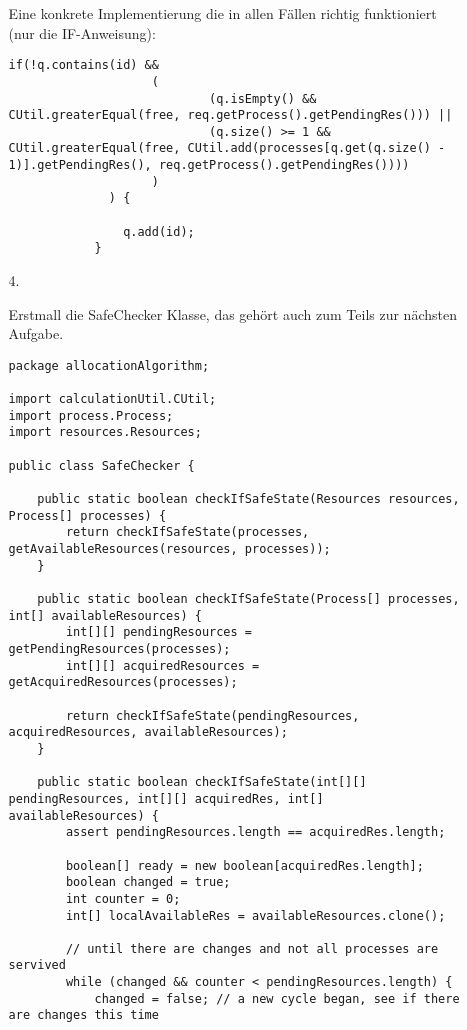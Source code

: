 \begin{enumerate}
\begin{enumerate}
Eine konkrete Implementierung die in allen Fällen richtig funktioniert (nur die IF-Anweisung):

\begin{lstlisting}[style=java]
if(!q.contains(id) &&
                    (
                            (q.isEmpty() && CUtil.greaterEqual(free, req.getProcess().getPendingRes())) ||
                            (q.size() >= 1 && CUtil.greaterEqual(free, CUtil.add(processes[q.get(q.size() - 1)].getPendingRes(), req.getProcess().getPendingRes())))
                    )
              ) {

                q.add(id);
            }
\end{lstlisting}

\item[4.]

Erstmall die SafeChecker Klasse, das gehört auch zum Teils zur nächsten Aufgabe. 

\begin{lstlisting}[style=java]
package allocationAlgorithm;

import calculationUtil.CUtil;
import process.Process;
import resources.Resources;

public class SafeChecker {

    public static boolean checkIfSafeState(Resources resources, Process[] processes) {
        return checkIfSafeState(processes, getAvailableResources(resources, processes));
    }

    public static boolean checkIfSafeState(Process[] processes, int[] availableResources) {
        int[][] pendingResources = getPendingResources(processes);
        int[][] acquiredResources = getAcquiredResources(processes);

        return checkIfSafeState(pendingResources, acquiredResources, availableResources);
    }

    public static boolean checkIfSafeState(int[][] pendingResources, int[][] acquiredRes, int[] availableResources) {
        assert pendingResources.length == acquiredRes.length;

        boolean[] ready = new boolean[acquiredRes.length];
        boolean changed = true;
        int counter = 0;
        int[] localAvailableRes = availableResources.clone();

        // until there are changes and not all processes are servived
        while (changed && counter < pendingResources.length) {
            changed = false; // a new cycle began, see if there are changes this time


\end{lstlisting}
\end{enumerate}
\end{enumerate}
